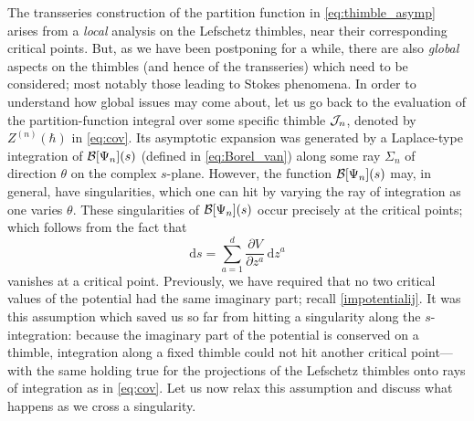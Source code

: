 \documentclass[11pt,a4paper]{article}
\newcommand{\CB}{{\cal B}}
\newcommand{\CJ}{{\cal J}}
\newcommand{\be}{\begin{equation}}
\newcommand{\ee}{\end{equation}}
\newcommand{\rmd}{{\mathrm{d}}}
\begin{document}
The transseries construction of the partition function in \eqref{eq:thimble_asymp} arises from a \textit{local} analysis on the Lefschetz thimbles, near their corresponding critical points. But, as we have been postponing for a while, there are also \textit{global} aspects on the thimbles (and hence of the transseries) which need to be considered; most notably those leading to Stokes phenomena. In order to understand how global issues may come about, let us go back to the evaluation of the partition-function integral over some specific thimble $\CJ_n$, denoted by $Z^{(n)} (\hbar)$ in \eqref{eq:cov}. Its asymptotic expansion was generated by a Laplace-type integration of $\CB[\Psi_n](s)$ (defined in \eqref{eq:Borel_van}) along some ray $\Sigma_n$ of direction $\theta$ on the complex $s$-plane. However, the function $\CB[\Psi_n](s)$ may, in general, have singularities, which one can hit by varying the ray of integration as one varies $\theta$. These singularities of $\CB[\Psi_n](s)$ occur precisely at the critical points; which follows from the fact that
%
\be
\rmd s = \sum_{a=1}^d \frac{\partial V}{\partial z^a}\, \rmd z^a
\ee
%
\noindent
vanishes at a critical point. Previously, we have required that no two critical values of the potential had the same imaginary part; recall \eqref{impotentialij}. It was this assumption which saved us so far from hitting a singularity along the $s$-integration: because the imaginary part of the potential is conserved on a thimble, integration along a fixed thimble could not hit another critical point---with the same holding true for the projections of the Lefschetz thimbles onto rays of integration as in \eqref{eq:cov}. Let us now relax this assumption and discuss what happens as we cross a singularity.
\end{document}
